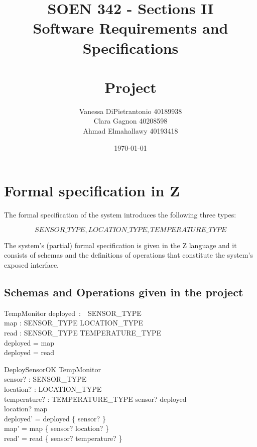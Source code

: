 \documentclass[12pt]{article}
\title{SOEN 342 - Sections II\\Software Requirements and Specifications\\
	\ \\
	Project}
\author{Vanessa DiPietrantonio 40189938\\
		Clara Gagnon 40208598\\
		Ahmad Elmahallawy 40193418}
\date{\today}
\begin{document}
		\maketitle
		
		\newpage

		\section{Formal specification in Z}
		
		The formal specification of the system introduces the following three types:
		
		\[ SENSOR\_TYPE, LOCATION\_TYPE, TEMPERATURE\_TYPE  \]
		
		\noindent The system's (partial) formal specification is given in the Z language and it consists of schemas and the definitions of operations that constitute the system's exposed interface.
		
	
		\subsection{Schemas and Operations given in the project}
		
		
		\begin{schema}{TempMonitor}
			deployed~:~~SENSOR\_TYPE\\
			map : SENSOR\_TYPE \nrightarrow LOCATION\_TYPE\\
			read : SENSOR\_TYPE  \nrightarrow TEMPERATURE\_TYPE\\
			\where
			deployed = \dom map\\
			deployed = \dom read
		\end{schema}
		
		
		
		\begin{schema}{DeploySensorOK}
			\Delta TempMonitor\\
			sensor? : SENSOR\_TYPE\\
			location? : LOCATION\_TYPE\\
			temperature? : TEMPERATURE\_TYPE
			\where
			sensor? \notin deployed\\
			location? \notin \ran map\\
			deployed' = deployed \cup \{ sensor? \}\\
			map' = map \cup \{ sensor? \mapsto location? \}\\
			read' = read \cup \{ sensor? \mapsto temperature? \}
		\end{schema}
		
\end{document}
